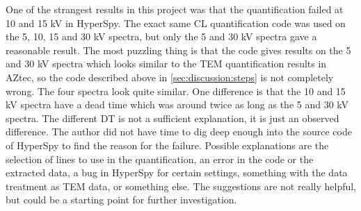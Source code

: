 One of the strangest results in this project was that the quantification failed at 10 and 15 kV in HyperSpy.
The exact same CL quantification code was used on the 5, 10, 15 and 30 kV spectra, but only the 5 and 30 kV spectra gave a reasonable result.
The most puzzling thing is that the code gives results on the 5 and 30 kV spectra which looks similar to the TEM quantification results in AZtec, so the code described above in \cref{sec:discussion:steps} is not completely wrong.
The four spectra look quite similar.
One difference is that the 10 and 15 kV spectra have a dead time which was around twice as long as the 5 and 30 kV spectra.
The different DT is not a sufficient explanation, it is just an observed difference.
The author did not have time to dig deep enough into the source code of HyperSpy to find the reason for the failure.
Possible explanations are the selection of lines to use in the quantification, an error in the code or the extracted data, a bug in HyperSpy for certain settings, something with the data treatment as TEM data, or something else.
The suggestions are not really helpful, but could be a starting point for further investigation.




















